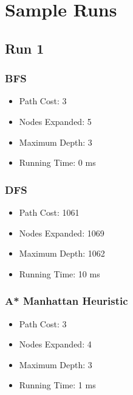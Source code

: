 \documentclass{article}
\begin{document}
\section{Sample Runs}
	\subsection{Run 1}
	\begin{center}
	\end{center}
		\subsubsection{BFS}
			\begin{itemize}
				\item Path Cost: 3
				\item Nodes Expanded: 5
				\item Maximum Depth: 3
				\item Running Time: 0 ms
			\end{itemize}
		\subsubsection{DFS}
			\begin{itemize}
				\item Path Cost: 1061
				\item Nodes Expanded: 1069
				\item Maximum Depth: 1062
				\item Running Time: 10 ms
			\end{itemize}
		\subsubsection{A* Manhattan Heuristic}
			\begin{itemize}
				\item Path Cost: 3
				\item Nodes Expanded: 4
				\item Maximum Depth: 3
				\item Running Time: 1 ms
			\end{itemize}
\end{document}
